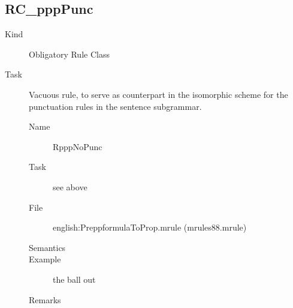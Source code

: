 \subsection{RC\_pppPunc}
\begin{description}
\item[Kind] Obligatory Rule Class
\item[Task] Vacuous rule, to serve as counterpart in the isomorphic scheme for 
the punctuation rules in the sentence subgrammar. 

\vspace{1 cm}
\begin{description}
\item[Name] RpppNoPunc
\item[Task] see above
\item[File] english:PreppformulaToProp.mrule (mrules88.mrule)
\item[Semantics] 
\item[Example] the ball out
\item[Remarks]
\end{description}

\end{description}




